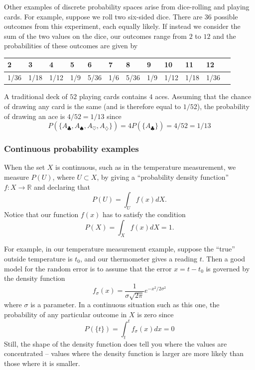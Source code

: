 \documentclass[
]{article}
\makeatletter
\newcounter{tableno}
\newenvironment{tablenos:no-prefix-table-caption}{
  \caption@ifcompatibility{}{
    \let\oldthetable\thetable
    \let\oldtheHtable\theHtable
    \renewcommand{\thetable}{tableno:\thetableno}
    \renewcommand{\theHtable}{tableno:\thetableno}
    \stepcounter{tableno}
    \captionsetup{labelformat=empty}
  }
}{
  \caption@ifcompatibility{}{
    \captionsetup{labelformat=default}
    \let\thetable\oldthetable
    \let\theHtable\oldtheHtable
    \addtocounter{table}{-1}
  }
}
\makeatother
\begin{document}
Other examples of discrete probability spaces arise from dice-rolling
and playing cards. For example, suppose we roll two six-sided dice.
There are \(36\) possible outcomes from this experiment, each equally
likely. If instead we consider the sum of the two values on the dice,
our outcomes range from \(2\) to \(12\) and the probabilities of these
outcomes are given by

\begin{tablenos:no-prefix-table-caption}

\begin{longtable}[]{@{}llllllllllll@{}}
\toprule
2 & 3 & 4 & 5 & 6 & 7 & 8 & 9 & 10 & 11 & 12 &\tabularnewline
\midrule
\endhead
1/36 & 1/18 & 1/12 & 1/9 & 5/36 & 1/6 & 5/36 & 1/9 & 1/12 & 1/18 & 1/36
&\tabularnewline
\bottomrule
\end{longtable}

\end{tablenos:no-prefix-table-caption}

A traditional deck of \(52\) playing cards contains \(4\) aces. Assuming
that the chance of drawing any card is the same (and is therefore equal
to \(1/52\)), the probability of drawing an ace is \(4/52=1/13\) since
\[
P(\{A_{\clubsuit},A_{\spadesuit},A_{\heartsuit},A_{\diamondsuit}\}) = 4P(\{A_{\clubsuit}\})=4/52=1/13
\]

\hypertarget{continuous-probability-examples}{%
\subsubsection{Continuous probability
examples}\label{continuous-probability-examples}}

When the set \(X\) is continuous, such as in the temperature
measurement, we measure \(P(U)\), where \(U\subset X\), by giving a
``probability density function'' \(f:X\to \mathbb{R}\) and declaring
that \[
P(U) = \int_{U}f(x) dX.
\] Notice that our function \(f(x)\) has to satisfy the condition \[
P(X)=\int_{X} f(x)dX = 1.
\]

For example, in our temperature measurement example, suppose the
``true'' outside temperature is \(t_0\), and our thermometer gives a
reading \(t\). Then a good model for the random error is to assume that
the error \(x=t-t_0\) is governed by the density function \[
f_\sigma(x) = \frac{1}{\sigma\sqrt{2\pi}}e^{-x^2/2\sigma^2}
\] where \(\sigma\) is a parameter. In a continuous situation such as
this one, the probability of any particular outcome in \(X\) is zero
since \[
P(\{t\})=\int_{t}^{t}f_{\sigma}(x)dx = 0
\] Still, the shape of the density function does tell you where the
values are concentrated -- values where the density function is larger
are more likely than those where it is smaller.
\end{document}
